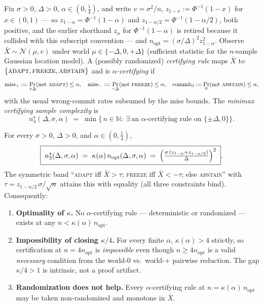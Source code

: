 Fix $\sigma>0$, $\Delta>0$, $\alpha\in(0,\tfrac14)$, and write $v=\sigma^2/n$,
$z_{1-x}:=\Phi^{-1}(1-x)$ for $x\in(0,1)$ --- so $z_{1-\alpha}=\Phi^{-1}(1-\alpha)$ and
$z_{1-\alpha/2}=\Phi^{-1}(1-\alpha/2)$, both positive, and the earlier shorthand $z_\alpha$ for
$\Phi^{-1}(1-\alpha)$ is retired because it collided with this subscript convention ---
and $n_{\mathrm{opt}}=(\sigma/\Delta)^2 z_{1-\alpha}^2$.  Observe
$\bar X\sim\mathcal N(\mu,v)$ under world $\mu\in\{-\Delta,0,+\Delta\}$ (sufficient statistic
for the $n$-sample Gaussian location model).  A (possibly randomized) \emph{certifying rule} maps
$\bar X$ to $\{\textsc{adapt},\textsc{freeze},\textsc{abstain}\}$ and is
\emph{$\alpha$-certifying} if
\[
  \mathrm{miss}_+:=\Pr_{+\Delta}(\text{not \textsc{adapt}})\le\alpha,\quad
  \mathrm{miss}_-:=\Pr_{-\Delta}(\text{not \textsc{freeze}})\le\alpha,\quad
  \mathrm{commit}_0:=\Pr_{0}(\text{not \textsc{abstain}})\le\alpha,
\]
with the usual wrong-commit rates subsumed by the miss bounds.  The \emph{minimax certifying
sample complexity} is
\[
  n^\star_{3}(\Delta,\sigma,\alpha)
  \;=\;\min\bigl\{\,n\in\mathbb N:\ \exists\ \text{an $\alpha$-certifying rule on }
  \{\pm\Delta,0\}\bigr\}.
\]

\begin{theorem}\label{thm:t1c-exact}
For every $\sigma>0$, $\Delta>0$, and $\alpha\in(0,\tfrac14)$,
\[
  \boxed{\;
  n^\star_{3}(\Delta,\sigma,\alpha)
  \;=\;\kappa(\alpha)\,n_{\mathrm{opt}}(\Delta,\sigma,\alpha)
  \;=\;\Bigl(\tfrac{\sigma\,(z_{1-\alpha}+z_{1-\alpha/2})}{\Delta}\Bigr)^2\; }.
\]
The symmetric band ``\textsc{adapt} iff $\bar X>\tau$; \textsc{freeze} iff $\bar X<-\tau$;
else \textsc{abstain}'' with $\tau=z_{1-\alpha/2}\,\sigma/\sqrt n$ attains this with equality
(all three constraints bind).  Consequently:
\begin{enumerate}
\item[(a)] \textbf{Optimality of $\kappa$.}  No $\alpha$-certifying rule --- deterministic or
randomized --- exists at any $n<\kappa(\alpha)\,n_{\mathrm{opt}}$.
\item[(b)] \textbf{Impossibility of closing $\kappa/4$.}  For every finite $\alpha$,
$\kappa(\alpha)>4$ strictly, so certification at $n=4n_{\mathrm{opt}}$ is \emph{impossible}
even though $n\ge4n_{\mathrm{opt}}$ is a valid \emph{necessary} condition from the
world-$0$ vs.\ world-$+$ pairwise reduction.  The gap $\kappa/4>1$ is intrinsic, not a proof
artifact.
\item[(c)] \textbf{Randomization does not help.}  Every $\alpha$-certifying rule at
$n=\kappa(\alpha)\,n_{\mathrm{opt}}$ may be taken non-randomized and monotone in $\bar X$.
\end{enumerate}
\end{theorem}


